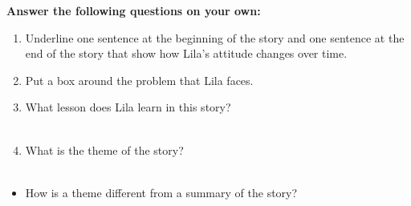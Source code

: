 \documentclass[12pt]{article}
\begin{document}
\vspace{1em}
\begin{tcolorbox}[colframe=black!60, colback=white, 
coltitle=black, colbacktitle=black!15, fonttitle=\bfseries\Large, 
title=Independent Practice, halign title=center, left=10pt, right=10pt, top=10pt, bottom=15pt]
\textbf{Answer the following questions on your own:}
\begin{enumerate}[itemsep=3em]
    \item Underline one sentence at the beginning of the story and one sentence at the end of the story that show how Lila's attitude changes over time.
    \item Put a box around the problem that Lila faces.
    \item What lesson does Lila learn in this story?
\\[0.8cm] \underline{\hspace{15cm}}  
    \\[0.8cm] \underline{\hspace{15cm}}  
    
    \item What is the theme of the story? 
\\[0.8cm] \underline{\hspace{15cm}}  
    \\[0.8cm] \underline{\hspace{15cm}}  
    
\end{enumerate}
\end{tcolorbox}

\vspace{1em}

\begin{tcolorbox}[colframe=black!60, colback=white, 
coltitle=black, colbacktitle=black!15, fonttitle=\bfseries\Large, 
title=Exit Ticket, halign title=center, left=10pt, right=10pt, top=10pt, bottom=15pt]

\begin{itemize}
    \item How is a theme different from a summary of the story?
\\[0.8cm] \underline{\hspace{15cm}}  
    \\[0.8cm] \underline{\hspace{15cm}}  
    \\[0.8cm] \underline{\hspace{15cm}} 
\end{itemize}
\end{tcolorbox}
\end{document}
